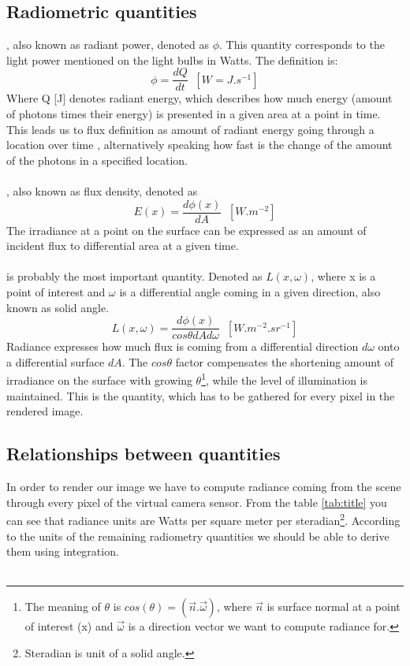 \subsection{Radiometric quantities}
, also known as radiant power, denoted as $\phi$. This quantity corresponds to the light power mentioned on the light bulbs in Watts. The definition is:
\begin{equation}
\phi=\frac{dQ}{dt}\;\;[W=J.s^{-1}]
\end{equation}
Where Q [J] denotes radiant energy, which describes how much energy (amount of photons times their energy) is presented in a given area at a point in time. This leads us to flux definition as  amount of radiant energy going through a location over time , alternatively speaking how fast is the change of the amount of the photons in a specified location. 
\\
\\
, also known as flux density, denoted as  
\begin{equation}
E(x)=\frac{d\phi(x)}{dA}\;\;[W.m^{-2}]
\end{equation}
The irradiance at a point  on the surface  can be expressed as an amount of incident flux to differential area at a given time.
\\
\\
 is probably the most important quantity. Denoted as $L(x,\omega)$, where x is a point of interest and $\omega$ is a differential angle coming in a given direction, also known as solid angle.
\begin{equation}
L(x,\omega)=\frac{d\phi(x)}{cos\theta dAd \omega}\;\;[W.m^{-2}.sr^{-1}]
\end{equation}
Radiance expresses how much flux is coming from a differential direction $d\omega$ onto a differential surface $dA$. The $cos\theta$ factor compensates the shortening amount of irradiance on the surface with growing $\theta$\footnote{The meaning of $\theta$ is $cos(\theta)=(\vec{n}.\vec{\omega})$, where $\vec{n}$ is surface normal at a point of interest (x) and $\vec{\omega}$ is a direction vector we want to compute radiance for.}, while the level of illumination is maintained. This is the quantity, which has to be gathered for every pixel in the rendered image.

\subsection{Relationships between quantities}
In order to render our image we have to compute radiance coming from the scene through every pixel of the virtual camera sensor. From the table \ref{tab:title} you can see that radiance units are Watts per square meter per steradian\footnote{Steradian is unit of a solid angle.}. According to the units of the remaining radiometry quantities we should be able to derive them using integration.\\
\\

